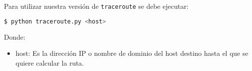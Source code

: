 Para utilizar nuestra versión de \texttt{traceroute} se debe ejecutar:

\begin{lstlisting}[language=bash]
  $ python traceroute.py <host> 
\end{lstlisting}

Donde:

\begin{itemize}
\item host: Es la dirección IP o nombre de dominio del host destino hasta el que se quiere calcular la ruta.
\end{itemize}
